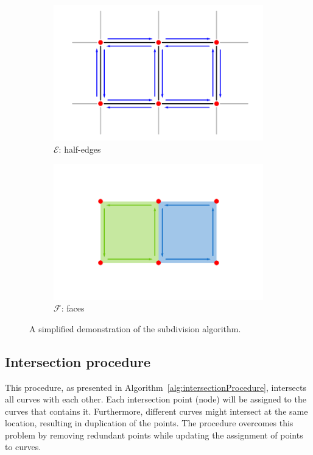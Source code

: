 \begin{figure}
  \begin{subfigure}{.4\textwidth}
    \includegraphics[width=\textwidth]{figures/subd_simpleExample_c.png}
    \caption{$\mathcal{E}$: half-edges} \label{subfig:subd_simpleExample_c}
  \end{subfigure}%
  \quad \quad%
  \begin{subfigure}{.4\textwidth}
    \includegraphics[width=\textwidth]{figures/subd_simpleExample_d.png}
    \caption{$\mathcal{F}$: faces} \label{subfig:subd_simpleExample_d}
  \end{subfigure}%
  \caption[xxx]
          {A simplified demonstration of the subdivision algorithm.}
  \label{fig:subd_simpleExample}
\end{figure}


\subsection{Intersection procedure}
This procedure, as presented in Algorithm~\ref{alg:intersectionProcedure}, intersects all curves with each other.
Each intersection point (node) will be assigned to the curves that contains it.
Furthermore, different curves might intersect at the same location, resulting in duplication of the points.
The procedure overcomes this problem by removing redundant points while updating the assignment of points to curves.

